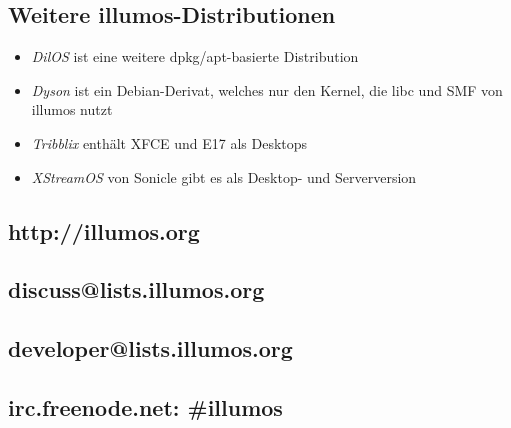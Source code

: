 \documentclass[11pt,foldmark,notumble]{leaflet}
\begin{document}
\subsection{Weitere illumos-Distributionen}
\begin{itemize}
\item \emph{DilOS} ist eine weitere dpkg/apt-basierte Distribution
\item \emph{Dyson} ist ein Debian-Derivat, welches nur den Kernel, die
  libc und SMF von illumos nutzt
\item \emph{Tribblix} enthält XFCE und E17 als Desktops
\item \emph{XStreamOS} von Sonicle gibt es als Desktop- und Serverversion
\end{itemize}

\subsection{http://illumos.org}
\subsection{discuss@lists.illumos.org}
\subsection{developer@lists.illumos.org}
\subsection{irc.freenode.net: \#illumos}
\end{document}
